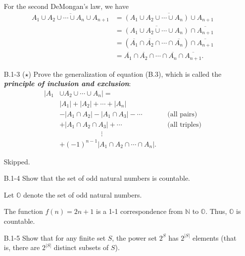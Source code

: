 \documentclass{report}
\makeatletter
\renewenvironment{framed}{%
 \def\FrameCommand##1{\hskip\@totalleftmargin
 \fboxsep=\FrameSep\fbox{##1}}%
 \MakeFramed {\advance\hsize-\width
   \@totalleftmargin\z@ \linewidth\hsize
   \@setminipage}}%
 {\par\unskip\endMakeFramed}
\makeatother
\begin{document}
\begin{enumerate}
\begin{framed}
For the second DeMongan's law, we have
\begin{equation*}
\begin{aligned}
  \overline{A_1 \cup A_2 \cup \cdots \cup A_n \cup A_{n + 1}}
  &= \overline{(A_1 \cup A_2 \cup \cdots \cup A_n) \cup A_{n + 1}}\\
  &= \overline{(A_1 \cup A_2 \cup \cdots \cup A_n)} \cap \overline{A_{n + 1}}\\
  &= (\overline{A_1} \cap \overline{A_2} \cap \cdots \cap \overline{A_n}) \cap \overline{A_{n + 1}}\\
  &= \overline{A_1} \cap \overline{A_2} \cap \cdots \cap \overline{A_n} \cap \overline{A_{n + 1}}.
\end{aligned}
\end{equation*}
\end{framed}

\item[B.1{-}3]{($\star$) Prove the generalization of equation (B.3), which is
called the \textbf{\emph{principle of inclusion and exclusion}}:
\begin{equation*}
\begin{aligned}
  | A_1 &\cup A_2 \cup \cdots \cup A_n | =\\
        &|A_1| + |A_2| + \cdots + |A_n|\\
        &- |A_1 \cap A_2| - |A_1 \cap A_3| - \cdots && \text{(all pairs)}\\
        &+ |A_1 \cap A_2 \cap A_3| + \cdots && \text{(all triples)}\\
        &\qquad\qquad\qquad\vdots\\
        &+ (-1)^{n - 1} |A_1 \cap A_2 \cap \cdots \cap A_n|.
\end{aligned}
\end{equation*}
}

\begin{framed}
Skipped.
\end{framed}

\item[B.1{-}4]{Show that the set of odd natural numbers is countable.}

\begin{framed}
Let $\mathbb{O}$ denote the set of odd natural numbers.

The function $f(n) = 2n + 1$ is a 1-1 correspondence from $\mathbb{N}$ to
$\mathbb{O}$.  Thus, $\mathbb{O}$ is countable.
\end{framed}

\newpage

\item[B.1{-}5]{Show that for any finite set $S$, the power set $2^S$ has
$2^{|S|}$ elements (that is, there are $2^{|S|}$ distinct subsets of $S$).}


\end{enumerate}
\end{document}
